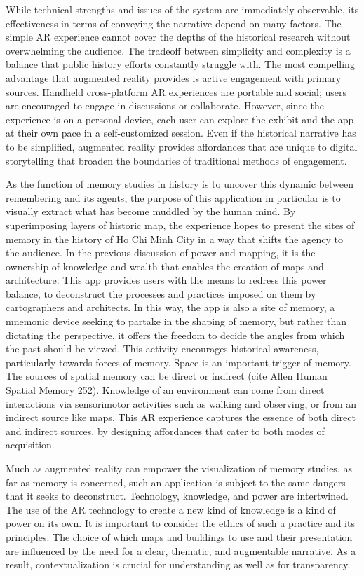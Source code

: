 While technical strengths and issues of the system are immediately observable, its effectiveness in terms of conveying the narrative depend on many factors. The simple AR experience cannot cover the depths of the historical research without overwhelming the audience. The tradeoff between simplicity and complexity is a balance that public history efforts constantly struggle with. The most compelling advantage that augmented reality provides is active engagement with primary sources. Handheld cross-platform AR experiences are portable and social; users are encouraged to engage in discussions or collaborate. However, since the experience is on a personal device, each user can explore the exhibit and the app at their own pace in a self-customized session. Even if the historical narrative has to be simplified, augmented reality provides affordances that are unique to digital storytelling that broaden the boundaries of traditional methods of engagement.

As the function of memory studies in history is to uncover this dynamic between remembering and its agents, the purpose of this application in particular is to visually extract what has become muddled by the human mind. By superimposing layers of historic map, the experience hopes to present the sites of memory in the history of Ho Chi Minh City in a way that shifts the agency to the audience. In the previous discussion of power and mapping, it is the ownership of knowledge and wealth that enables the creation of maps and architecture. This app provides users with the means to redress this power balance, to deconstruct the processes and practices imposed on them by cartographers and architects. In this way, the app is also a site of memory, a mnemonic device seeking to partake in the shaping of memory, but rather than dictating the perspective, it offers the freedom to decide the angles from which the past should be viewed. This activity encourages historical awareness, particularly towards forces of memory. Space is an important trigger of memory. The sources of spatial memory can be direct or indirect (cite Allen Human Spatial Memory 252). Knowledge of an environment can come from direct interactions via sensorimotor activities such as walking and observing, or from an indirect source like maps. This AR experience captures the essence of both direct and indirect sources, by designing affordances that cater to both modes of acquisition.

Much as augmented reality can empower the visualization of memory studies, as far as memory is concerned, such an application is subject to the same dangers that it seeks to deconstruct. Technology, knowledge, and power are intertwined. The use of the AR technology to create a new kind of knowledge is a kind of power on its own. It is important to consider the ethics of such a practice and its principles. The choice of which maps and buildings to use and their presentation are influenced by the need for a clear, thematic, and augmentable narrative. As a result, contextualization is crucial for understanding as well as for transparency.
